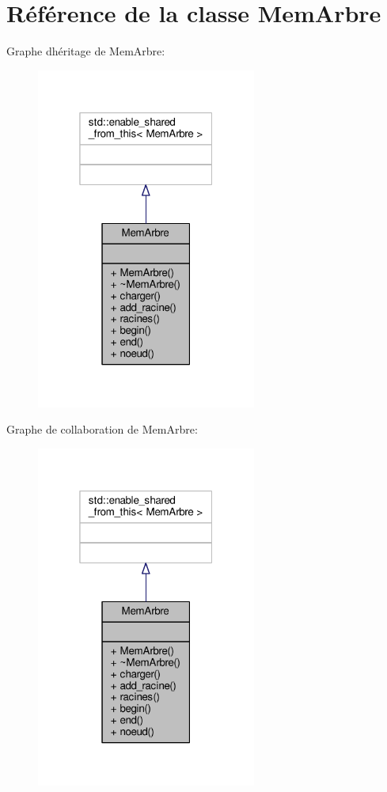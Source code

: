 \hypertarget{classMemArbre}{}\section{Référence de la classe Mem\+Arbre}
\label{classMemArbre}


Graphe d\textquotesingle{}héritage de Mem\+Arbre\+:\nopagebreak
\begin{figure}[H]
\begin{center}
\leavevmode
\includegraphics[width=205pt]{classMemArbre__inherit__graph}
\end{center}
\end{figure}


Graphe de collaboration de Mem\+Arbre\+:\nopagebreak
\begin{figure}[H]
\begin{center}
\leavevmode
\includegraphics[width=205pt]{classMemArbre__coll__graph}
\end{center}
\end{figure}
